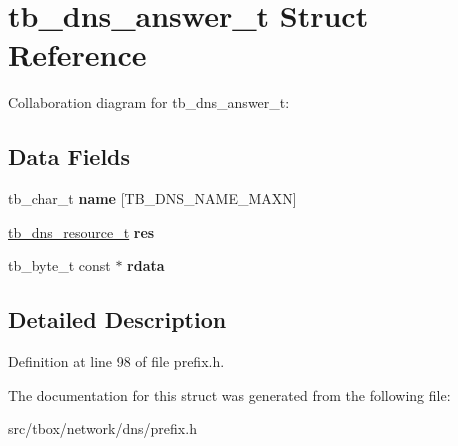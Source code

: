 \hypertarget{structtb__dns__answer__t}{\section{tb\-\_\-dns\-\_\-answer\-\_\-t Struct Reference}
\label{structtb__dns__answer__t}
}


Collaboration diagram for tb\-\_\-dns\-\_\-answer\-\_\-t\-:
\subsection*{Data Fields}
\begin{DoxyCompactItemize}
\item 
\hypertarget{structtb__dns__answer__t_a889fcb3afcfb05058f8d89298dd5aa27}{tb\-\_\-char\-\_\-t {\bfseries name} \mbox{[}T\-B\-\_\-\-D\-N\-S\-\_\-\-N\-A\-M\-E\-\_\-\-M\-A\-X\-N\mbox{]}}\label{structtb__dns__answer__t_a889fcb3afcfb05058f8d89298dd5aa27}

\item 
\hypertarget{structtb__dns__answer__t_aeeae21dce5cabb720f9403b9c933dcdd}{\hyperlink{structtb__dns__resource__t}{tb\-\_\-dns\-\_\-resource\-\_\-t} {\bfseries res}}\label{structtb__dns__answer__t_aeeae21dce5cabb720f9403b9c933dcdd}

\item 
\hypertarget{structtb__dns__answer__t_a962353befc2f84eb6a36bc6ea949f890}{tb\-\_\-byte\-\_\-t const $\ast$ {\bfseries rdata}}\label{structtb__dns__answer__t_a962353befc2f84eb6a36bc6ea949f890}

\end{DoxyCompactItemize}


\subsection{Detailed Description}


Definition at line 98 of file prefix.\-h.



The documentation for this struct was generated from the following file\-:\begin{DoxyCompactItemize}
\item 
src/tbox/network/dns/prefix.\-h\end{DoxyCompactItemize}
